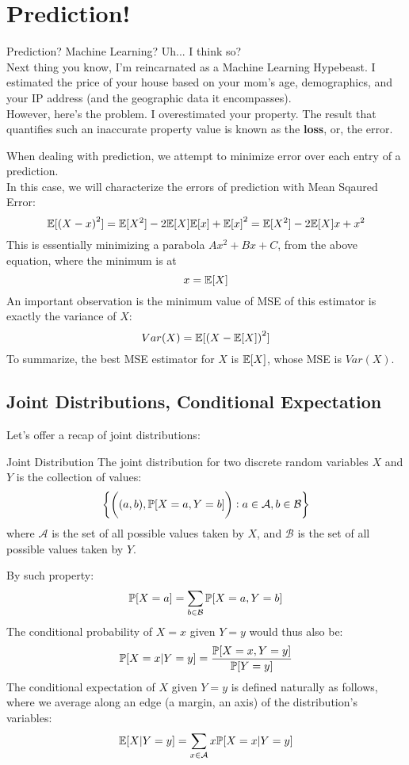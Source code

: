 \chapter{Prediction!}

Prediction? Machine Learning? Uh... I think so? \\
Next thing you know, I'm reincarnated as a Machine Learning Hypebeast. I estimated the price of your house based on your mom's age, demographics, and your IP address (and the geographic data it encompasses). \\
However, here's the problem. I overestimated your property. The result that quantifies such an inaccurate property value is known as the \textbf{loss}, or, the error.

When dealing with prediction, we attempt to minimize error over each entry of a prediction. \\
In this case, we will characterize the errors of prediction with Mean Sqaured Error:
\[
    \E[{(X - x)}^2] = \E[X^2] - 2 \E[X] \E[x] + {\E[x]}^2 = \E[X^2] - 2\E[X]x + x^2
\]
This is essentially minimizing a parabola $Ax^2 + Bx + C$, from the above equation, where the minimum is at
\[x = \E[X]\]
An important observation is the minimum value of MSE of this estimator is exactly the variance of $X$:
\[Var(X) = \E[{(X - \E[X])}^2]\]
To summarize, the best MSE estimator for $X$ is $\E[X]$, whose MSE is $Var(X)$.

\section{Joint Distributions, Conditional Expectation}
Let's offer a recap of joint distributions:
\begin{ln-define}{Joint Distribution}{}
    The joint distribution for two discrete random variables $X$ and $Y$ is the collection of values:
    \[\bigg\{ \bigg((a, b), \P[X = a, Y = b] \bigg) : a \in \mathcal{A}, b \in \mathcal{B} \bigg\}\]
    where $\mathcal{A}$ is the set of all possible values taken by $X$, and $\mathcal{B}$ is the set of all possible values taken by $Y$.
\end{ln-define}
By such property:
\[\P[X = a] = \sum_{b \in \mathcal{B}} \P[X = a, Y = b]\]
The conditional probability of $X = x$ given $Y = y$ would thus also be:
\[\P[X = x | Y = y] = \frac{\P[X = x, Y = y]}{\P[Y = y]}\]
The conditional expectation of $X$ given $Y = y$ is defined naturally as follows, where we average along an edge (a margin, an axis) of the distribution's variables:
\[\E[X | Y = y] = \sum_{x \in \mathcal{A}} x \P[X = x | Y = y]\]


